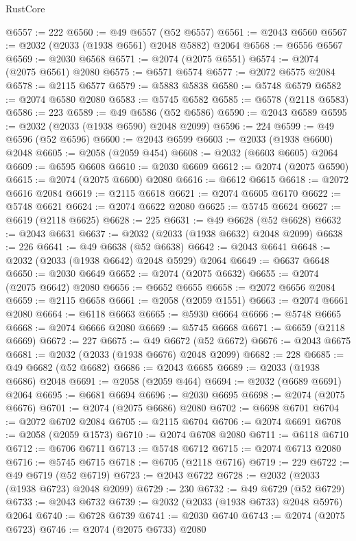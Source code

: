 \begin{lexlean}{RustCore}
\begin{coremodule}
@6557 := 222
@6560 := @49 @6557 (@52 @6557)
@6561 := @2043 @6560
@6567 := @2032 (@2033 (@1938 @6561) @2048 @5882) @2064
@6568 := @6556 @6567
@6569 := @2030 @6568
@6571 := @2074 (@2075 @6551)
@6574 := @2074 (@2075 @6561) @2080
@6575 := @6571 @6574
@6577 := @2072 @6575 @2084
@6578 := @2115 @6577
@6579 := @5883 @5838
@6580 := @5748 @6579
@6582 := @2074 @6580 @2080
@6583 := @5745 @6582
@6585 := @6578 (@2118 @6583)
@6586 := 223
@6589 := @49 @6586 (@52 @6586)
@6590 := @2043 @6589
@6595 := @2032 (@2033 (@1938 @6590) @2048 @2099)
@6596 := 224
@6599 := @49 @6596 (@52 @6596)
@6600 := @2043 @6599
@6603 := @2033 (@1938 @6600) @2048
@6605 := @2058 (@2059 @454)
@6608 := @2032 (@6603 @6605) @2064
@6609 := @6595 @6608
@6610 := @2030 @6609
@6612 := @2074 (@2075 @6590)
@6615 := @2074 (@2075 @6600) @2080
@6616 := @6612 @6615
@6618 := @2072 @6616 @2084
@6619 := @2115 @6618
@6621 := @2074 @6605 @6170
@6622 := @5748 @6621
@6624 := @2074 @6622 @2080
@6625 := @5745 @6624
@6627 := @6619 (@2118 @6625)
@6628 := 225
@6631 := @49 @6628 (@52 @6628)
@6632 := @2043 @6631
@6637 := @2032 (@2033 (@1938 @6632) @2048 @2099)
@6638 := 226
@6641 := @49 @6638 (@52 @6638)
@6642 := @2043 @6641
@6648 := @2032 (@2033 (@1938 @6642) @2048 @5929) @2064
@6649 := @6637 @6648
@6650 := @2030 @6649
@6652 := @2074 (@2075 @6632)
@6655 := @2074 (@2075 @6642) @2080
@6656 := @6652 @6655
@6658 := @2072 @6656 @2084
@6659 := @2115 @6658
@6661 := @2058 (@2059 @1551)
@6663 := @2074 @6661 @2080
@6664 := @6118 @6663
@6665 := @5930 @6664
@6666 := @5748 @6665
@6668 := @2074 @6666 @2080
@6669 := @5745 @6668
@6671 := @6659 (@2118 @6669)
@6672 := 227
@6675 := @49 @6672 (@52 @6672)
@6676 := @2043 @6675
@6681 := @2032 (@2033 (@1938 @6676) @2048 @2099)
@6682 := 228
@6685 := @49 @6682 (@52 @6682)
@6686 := @2043 @6685
@6689 := @2033 (@1938 @6686) @2048
@6691 := @2058 (@2059 @464)
@6694 := @2032 (@6689 @6691) @2064
@6695 := @6681 @6694
@6696 := @2030 @6695
@6698 := @2074 (@2075 @6676)
@6701 := @2074 (@2075 @6686) @2080
@6702 := @6698 @6701
@6704 := @2072 @6702 @2084
@6705 := @2115 @6704
@6706 := @2074 @6691
@6708 := @2058 (@2059 @1573)
@6710 := @2074 @6708 @2080
@6711 := @6118 @6710
@6712 := @6706 @6711
@6713 := @5748 @6712
@6715 := @2074 @6713 @2080
@6716 := @5745 @6715
@6718 := @6705 (@2118 @6716)
@6719 := 229
@6722 := @49 @6719 (@52 @6719)
@6723 := @2043 @6722
@6728 := @2032 (@2033 (@1938 @6723) @2048 @2099)
@6729 := 230
@6732 := @49 @6729 (@52 @6729)
@6733 := @2043 @6732
@6739 := @2032 (@2033 (@1938 @6733) @2048 @5976) @2064
@6740 := @6728 @6739
@6741 := @2030 @6740
@6743 := @2074 (@2075 @6723)
@6746 := @2074 (@2075 @6733) @2080

\end{coremodule}
\end{lexlean}
